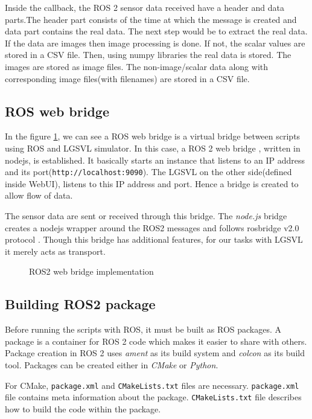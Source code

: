 Inside the callback, the ROS 2 sensor data received have a header and data parts.The header part consists of the time at which the message is created and data part
contains the real data. The next step would be to extract the real data. If the data are images then image processing is
done. If not, the scalar values are stored in a CSV file. Then, using numpy libraries the
real data is stored. The images are stored as image files. The non-image/scalar data  along
with corresponding image files(with filenames) are
stored in a CSV file.

\subsection{ROS web bridge}
In the figure \ref{fig:ros2webbridge}, we can see a ROS web bridge is a virtual bridge between scripts using ROS and LGSVL simulator. In this
case, a ROS 2 web bridge \cite{ros2webbridge}, written in nodejs, is established. It basically starts an instance
that listens to an IP address and its port(\texttt{http://localhost:9090}). The LGSVL on the other side(defined inside
WebUI), listens to this IP address and port. Hence a bridge is created to allow flow of data.

The sensor data are sent or received through this bridge. The \textit{node.js} bridge
creates a nodejs wrapper around the ROS2 messages and follows rosbridge v2.0 protocol
\cite{ros2protocol}. Though this bridge has additional features, for our tasks with LGSVL
it merely acts as transport.

\begin{figure}[h]
	\centering
    \def\svgwidth{\textwidth}
    \caption{ROS2 web bridge implementation}
    \label{fig:ros2webbridge}
\end{figure}

\iffalse
\subsection{Building ROS2 package}
Before running the scripts with ROS, it must be built as ROS packages.  A package is a
container for ROS 2 code which makes it easier to share with others. Package creation in
ROS 2 uses \textit{ament} as its build system and \textit{colcon} as its build tool.
Packages can be created either in \textit{CMake} or \textit{Python}.

For CMake, \texttt{package.xml} and \texttt{CMakeLists.txt} files are necessary. \texttt{package.xml}
file contains meta information about the package. \texttt{CMakeLists.txt} file describes how to build the code within the package.

